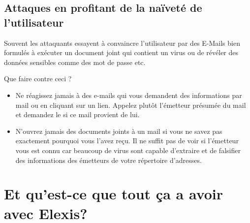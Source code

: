 \subsection{Attaques en profitant de la naïveté de l'utilisateur}

Souvent les attaquants essayent à convaincre l'utilisateur par des E-Mails bien formulés à exécuter un document joint qui contient un virus ou de révéler des données sensibles comme des mot de passe etc.

\medskip

Que faire contre ceci ?

\begin{itemize}
    \item{Ne réagissez jamais à des e-mails qui vous demandent des informations par mail ou en cliquant sur un lien. Appelez plutôt l'émetteur présumée du mail et demandez le si ce mail provient de lui.}
    \item{N'ouvrez jamais des documents joints à un mail si vous ne savez pas exactement pourquoi vous l'avez reçu. Il ne suffit pas de voir si l'émetteur vous est connu car beaucoup de virus sont capable d'extraire et de falsifier des informations des émetteurs de votre répertoire d'adresses. }
\end{itemize}


\section{Et qu'est-ce que tout ça a avoir avec Elexis?}

